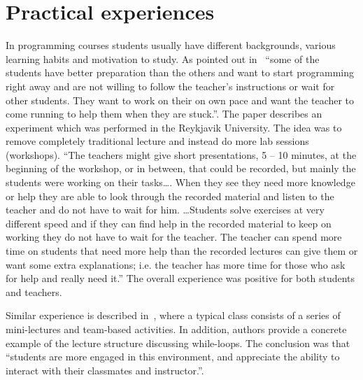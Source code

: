 \documentclass{article}
\begin{document}
\section{Practical experiences}


In programming courses students usually have different backgrounds,
various learning habits and motivation to study. As
pointed out in~\cite{experiment_iceland_2006} ``some of the students
have better preparation than the others and want to start programming
right away and are not willing to follow the teacher's instructions or
wait for other students. They want to work on their on own pace and
want the teacher to come running to help them when they are stuck.''.
The paper describes an experiment which was performed in the Reykjavik
University. The idea was to remove completely traditional lecture and
instead do more lab sessions (workshops). ``The teachers might give
short presentations, 5 – 10 minutes, at the beginning of the workshop,
or in between, that could be recorded, but mainly the students were
working on their tasks\ldots. When they see they need more knowledge
or help they are able to look through the recorded material and listen to the
teacher and do not have to wait for him. \ldots Students solve
exercises at very different speed and if they can find help in the
recorded material to keep on working they do not have to wait for the
teacher. The teacher can spend more time on students that need more
help than the recorded lectures can give them or want some extra
explanations; i.e. the teacher has more time for those who ask for
help and really need it.'' The overall experience was positive for
both students and teachers.

Similar experience is described in~\cite{cordes2002active}, where a
typical class consists of a series of mini-lectures and team-based
activities.  In addition, authors provide a concrete example of the
lecture structure discussing while-loops. The conclusion was that
``students are more engaged in this environment, and appreciate the
ability to interact with their classmates and instructor.''.
\end{document}
